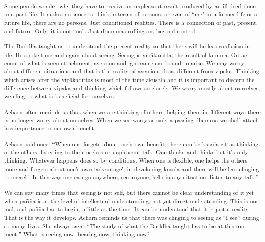 \textsuperscript{\textdutch{Some people wonder why they have to receive
an unpleasant result produced by an ill deed done in a past life.
}\textenglish[variant=american]{It makes no sense to think in terms of
persons, or even of }``\textenglish[variant=american]{me" in a former
life or a future life, there are no persons. Just conditioned
realities.}\textdutch{ }\textenglish[variant=american]{There is
}\textdutch{a }\textenglish[variant=american]{connection of past,
present,}\textdutch{ and}\textenglish[variant=american]{ future. Only,
it is not }\textdutch{``us''}\textenglish[variant=american]{. Just
}\textdutch{dhammas}\textenglish[variant=american]{ rolling on, beyond
control.}}

\textsuperscript{\textdutch{The Buddha taught us to understand the
present reality so that there will be less confusion in life. He spoke
time and again about seeing. Seeing is vipākacitta, the result of kamma.
On account of what is seen attachment, aversion and ignorance are bound
to arise. We may worry about different situations and that is the
reality of aversion, dosa, different from vipāka. Thinking which arises
after the vipākacittas is most of the time akusala and it is important
to discern the difference between vipāka and thinking which follows so
closely. We worry mostly about ourselves, we cling to what is beneficial
for ourselves. }}

\textsuperscript{\textdutch{Acharn often reminds us that when we are
thinking of others, helping them in different ways there is no longer
worry about ourselves. When we see worry as only a passing dhamma we
shall attach less importance to our own benefit. }}

\textsuperscript{\textdutch{Acharn said once:
``}\textenglish[variant=american]{When one forgets about one's own
benefit, there can be kusala cittas thinking of the others, listening to
their useless or unpleasant talk. One thinks and thinks but it's only
thinking. Whatever happens does so by conditions. When one is flexible,
one helps the others more and forgets about one's own
}\textdutch{`}\textenglish[variant=american]{advantage}\textdutch{'},
\textdutch{in }\textenglish[variant=american]{developing kusala and
}\textdutch{there will be }\textenglish[variant=american]{less clinging
to oneself. }\textdutch{In t}\textenglish[variant=american]{his way one
can go anywhere, see anyone, help in any situation, listen to any
talk.}\textdutch{''}}

\textsuperscript{\textenglish[variant=american]{We can say many times
that seeing is not self, but there cannot be clear understanding of it
yet when pa}ñ\textdutch{ñā}\textenglish[variant=american]{ is at the
level of intellectual understanding, not yet direct understanding. This
is normal, and pa}ññ\textdutch{ā}\textenglish[variant=american]{ has to
begin, a little at the time. It can be understood that it is just a
reality. That is the way it develops. Acharn reminds us that there was
clinging to seeing as }``\textenglish[variant=american]{I see}''
\textenglish[variant=american]{during so many lives. She always says:
}\textdutch{``T}\textenglish[variant=american]{he study of what the
Buddha taught has to be at this
moment.}\textdutch{''}\textenglish[variant=american]{ What is seeing
now, hearing now, thinking now?}}

